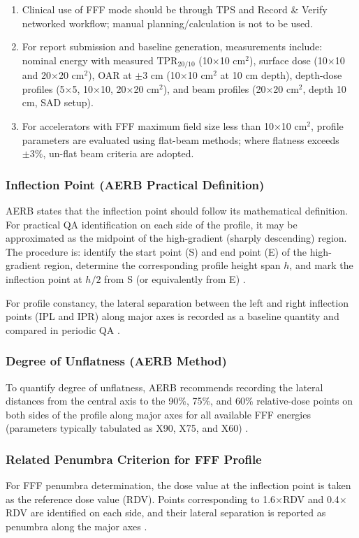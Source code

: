 \begin{enumerate}
    \item Clinical use of FFF mode should be through TPS and Record \& Verify networked workflow; manual planning/calculation is not to be used.
    \item For report submission and baseline generation, measurements include: nominal energy with measured TPR$_{20/10}$ (10$\times$10 cm$^2$), surface dose (10$\times$10 and 20$\times$20 cm$^2$), OAR at $\pm$3 cm (10$\times$10 cm$^2$ at 10 cm depth), depth-dose profiles (5$\times$5, 10$\times$10, 20$\times$20 cm$^2$), and beam profiles (20$\times$20 cm$^2$, depth 10 cm, SAD setup).
    \item For accelerators with FFF maximum field size less than 10$\times$10 cm$^2$, profile parameters are evaluated using flat-beam methods; where flatness exceeds $\pm 3\%$, un-flat beam criteria are adopted.
\end{enumerate}

\subsubsection{Inflection Point (AERB Practical Definition)}
AERB states that the inflection point should follow its mathematical definition. For practical QA identification on each side of the profile, it may be approximated as the midpoint of the high-gradient (sharply descending) region. The procedure is: identify the start point (S) and end point (E) of the high-gradient region, determine the corresponding profile height span $h$, and mark the inflection point at $h/2$ from S (or equivalently from E) \cite{aerb_qa_radiotherapy}.

For profile constancy, the lateral separation between the left and right inflection points (IPL and IPR) along major axes is recorded as a baseline quantity and compared in periodic QA \cite{aerb_qa_radiotherapy}.

\subsubsection{Degree of Unflatness (AERB Method)}
To quantify degree of unflatness, AERB recommends recording the lateral distances from the central axis to the 90\%, 75\%, and 60\% relative-dose points on both sides of the profile along major axes for all available FFF energies (parameters typically tabulated as X90, X75, and X60) \cite{aerb_qa_radiotherapy}.

\subsubsection{Related Penumbra Criterion for FFF Profile}
For FFF penumbra determination, the dose value at the inflection point is taken as the reference dose value (RDV). Points corresponding to 1.6$\times$RDV and 0.4$\times$RDV are identified on each side, and their lateral separation is reported as penumbra along the major axes \cite{aerb_qa_radiotherapy}.

